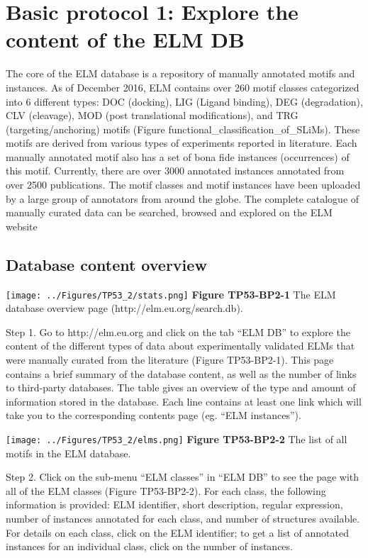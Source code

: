 \section{Basic protocol 1: Explore the content of the ELM
DB}\label{basic-protocol-1-explore-the-content-of-the-elm-db}

The core of the ELM database is a repository of manually annotated
motifs and instances. As of December 2016, ELM contains over 260 motif
classes categorized into 6 different types: DOC (docking), LIG (Ligand
binding), DEG (degradation), CLV (cleavage), MOD (post translational
modifications), and TRG (targeting/anchoring) motifs (Figure
functional\_classification\_of\_SLiMs). These motifs are derived from
various types of experiments reported in literature. Each manually
annotated motif also has a set of bona fide instances (occurrences) of
this motif. Currently, there are over 3000 annotated instances annotated
from over 2500 publications. The motif classes and motif instances have
been uploaded by a large group of annotators from around the globe. The
complete catalogue of manually curated data can be searched, browsed and
explored on the ELM website

\subsection{Database content overview}\label{database-content-overview}

\texttt{[image: ../Figures/TP53\_2/stats.png]} \textbf{Figure TP53-BP2-1}
The ELM database overview page (http://elm.eu.org/search.db).

Step 1. Go to http://elm.eu.org and click on the tab ``ELM DB'' to
explore the content of the different types of data about experimentally
validated ELMs that were manually curated from the literature (Figure
TP53-BP2-1). This page contains a brief summary of the database content,
as well as the number of links to third-party databases. The table gives
an overview of the type and amount of information stored in the
database. Each line contains at least one link which will take you to
the corresponding contents page (eg. ``ELM instances'').

\texttt{[image: ../Figures/TP53\_2/elms.png]} \textbf{Figure TP53-BP2-2}
The list of all motifs in the ELM database.

Step 2. Click on the sub-menu ``ELM classes'' in ``ELM DB'' to see the
page with all of the ELM classes (Figure TP53-BP2-2). For each class,
the following information is provided: ELM identifier, short
description, regular expression, number of instances annotated for each
class, and number of structures available. For details on each class,
click on the ELM identifier; to get a list of annotated instances for an
individual class, click on the number of instances.

